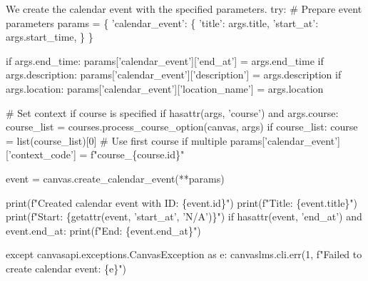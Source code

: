 We create the calendar event with the specified parameters.
\nwenddocs{}\endmoddef\nwstartdeflinemarkup{}\nwenddeflinemarkup
try:
  # Prepare event parameters
  params = \{
    'calendar_event': \{
      'title': args.title,
      'start_at': args.start_time,
    \}
  \}
  
  if args.end_time:
    params['calendar_event']['end_at'] = args.end_time
  if args.description:
    params['calendar_event']['description'] = args.description  
  if args.location:
    params['calendar_event']['location_name'] = args.location
    
  # Set context if course is specified
  if hasattr(args, 'course') and args.course:
    course_list = courses.process_course_option(canvas, args)
    if course_list:
      course = list(course_list)[0]  # Use first course if multiple
      params['calendar_event']['context_code'] = f"course_\{course.id\}"
  
  event = canvas.create_calendar_event(**params)
  
  print(f"Created calendar event with ID: \{event.id\}")
  print(f"Title: \{event.title\}")
  print(f"Start: \{getattr(event, 'start_at', 'N/A')\}")
  if hasattr(event, 'end_at') and event.end_at:
    print(f"End: \{event.end_at\}")
  
except canvasapi.exceptions.CanvasException as e:
  canvaslms.cli.err(1, f"Failed to create calendar event: \{e\}")
\nwendcode{}

%
%
%
%
%
%
%
%
%
%
\nwdocspar
\nwenddocs{}
